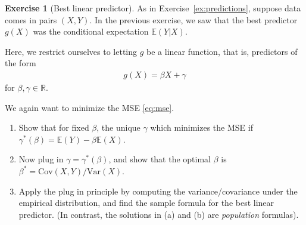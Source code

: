 \documentclass[11pt]{article}
\theoremstyle{definition}
\newtheorem{exercise}[]{Exercise}
\newcommand{\E}{\mathbb{E}}
\newcommand{\cov}{\text{Cov}}
\newcommand{\var}{\text{Var}}
\begin{document}
\begin{exercise}[Best linear predictor]
As in Exercise~\ref{ex:predictions},
suppose data comes in pairs $(X, Y)$.
In the previous exercise, we saw that
the best predictor $g(X)$ was the conditional
expectation $\E(Y | X)$.

Here, we restrict ourselves to letting $g$
be a linear function, that is, predictors of the form
\begin{align*}
  g(X) = \beta X + \gamma
\end{align*}
for $\beta, \gamma\in\mathbb{R}$.

We again want to minimize the MSE \eqref{eq:mse}.

\begin{enumerate}[label = (\alph*)]
  \item Show that for fixed $\beta$,
  the unique $\gamma$ which minimizes the MSE
  if $\gamma^*(\beta) = \E(Y) - \beta \E(X)$.
  \item Now plug in $\gamma = \gamma^*(\beta)$,
  and show that the optimal $\beta$ is
  $\beta^*=\cov(X, Y) / \var(X)$.
  \item Apply the plug in principle by
  computing the
  variance/covariance under the empirical distribution,
  and find
  the sample formula for the best linear predictor.
  (In contrast, the solutions in (a) and (b) are
  \textit{population} formulas). 
\end{enumerate}

\end{exercise}
\end{document}
